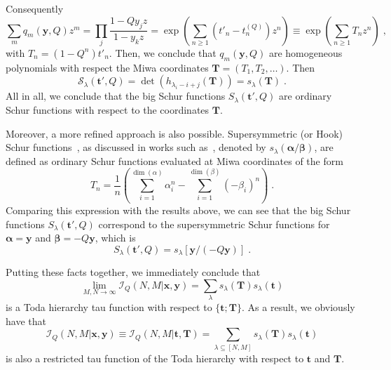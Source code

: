 \documentclass[a4paper,11pt]{amsart}
\begin{document}
Consequently
\begin{equation}
 \sum_{m} q_m(\bm{y}, Q) z^m =
 \prod_j \frac{1 - Q y_j z}{1 - y_k z}
 = \exp \left( \sum_{n\geq 1} (t'_n - t_n^{(Q)})z^n \right)
 \equiv \exp \left( \sum_{n\geq 1} T_n z^n \right)\; ,
\end{equation}
with \(T_n = (1 - Q^n) t'_n\). Then, we conclude that \(q_m(\bm{y}, Q)\)
are homogeneous polynomials with respect the Miwa coordinates
\(\bm{T} = (T_1, T_2, \dots)\). Then
\begin{equation}
  \mathcal{S}_\lambda(\bm{t}', Q) = \det \left(h_{\lambda_i - i +j}(\bm{T})\right) = s_\lambda(\bm{T})\; .
\end{equation}
All in all, we conclude that the big Schur functions
\(S_\lambda(\bm{t}', Q)\) are ordinary Schur functions with respect to
the coordinates \(\bm{T}\).

Moreover, a more refined approach is also possible. Supersymmetric (or
Hook) Schur functions~\cite{Berele:1983}, as discussed in works such
as~\cite{Macdonald:1998, Moens:2003}, denoted by
\(s_\lambda(\bm{\alpha}/\bm{\beta})\), are defined as ordinary Schur
functions evaluated at Miwa coordinates of the form
\begin{equation}
  T_n = \frac{1}{n} \left( \sum_{i=1}^{\dim(\alpha)} \alpha_i^n
       - \sum_{i=1}^{\dim(\beta)} (-\beta_i)^n\right)\; .
\end{equation}
Comparing this expression with the results above, we can see that the
big Schur functions \(S_\lambda(\bm{t}', Q)\) correspond to the
supersymmetric Schur functions for \(\bm{\alpha} = \bm{y}\) and
\(\bm{\beta} = - Q \bm{y}\), which is
\begin{equation}
  S_\lambda(\bm{t}', Q) = s_\lambda[\bm{y}/(- Q\bm{y})]\; .
\end{equation}

Putting these facts together, we immediately conclude that
\begin{equation}
\lim_{M,N\to \infty}\mathcal{I}_Q(N,M|\bm{x}, \bm{y}) = 
  \sum_\lambda s_\lambda(\bm{T}) s_\lambda (\bm{t})
\end{equation}
is a Toda hierarchy tau function with respect to
\(\{\bm{t};\bm{T}\}\). As a result, we obviously have that
\begin{equation}
  \mathcal{I}_Q(N,M| \bm{x}, \bm{y}) \equiv \mathcal{I}_Q(N,M| \bm{t}, \bm{T})
  = \sum_{\lambda \subseteq [N,M]} s_\lambda(\bm{T}) s_\lambda(\bm{t})
\end{equation}
is also a restricted tau function of the Toda hierarchy with respect
to \(\bm{t}\) and \(\bm{T}\).
\end{document}
